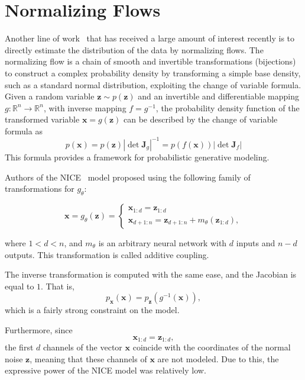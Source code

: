 \documentclass[a4paper,12pt]{article}
\theoremstyle{plain} %
\theoremstyle{definition} %
\theoremstyle{remark} %
\begin{document}
\section*{Normalizing Flows}

Another line of work~\cite{karami2020advances} that has received a large amount of interest recently is to directly estimate the distribution of the data by normalizing flows. The normalizing flow is a chain of smooth and invertible transformations (bijections) to construct a complex probability density by transforming a simple base density, such as a standard normal distribution, exploiting the change of variable formula.
Given a random variable $\boldsymbol{z} \sim p(\boldsymbol{z})$ and an invertible and differentiable mapping $g: \mathbb{R}^n \rightarrow \mathbb{R}^n$, with inverse mapping $f = g^{-1}$, the probability density function of the transformed variable $\boldsymbol{x} = g(\boldsymbol{z})$ can be described by the change of variable formula as
\begin{equation} 
p(\boldsymbol{x}) = p(\boldsymbol{z}) \left| \det \boldsymbol{J}_g \right|^{-1} = p(f(\boldsymbol{x})) \left| \det \boldsymbol{J}_f \right| 
\end{equation}
This formula provides a framework for probabilistic generative modeling.

Authors of the NICE~\cite{dinh2014nice} model proposed using the following family of transformations for $g_\theta$:

\[
\boldsymbol{x} = g_\theta(\boldsymbol{z}) = \begin{cases}
\boldsymbol{x}_{1:d} = \boldsymbol{z}_{1:d} \\
\boldsymbol{x}_{d+1:n} = \boldsymbol{z}_{d+1:n} + m_\theta(\boldsymbol{z}_{1:d}),
\end{cases}
\]

where $1 < d < n$, and $m_\theta$ is an arbitrary neural network with $d$ inputs and $n-d$ outputs. This transformation is called additive coupling.

The inverse transformation is computed with the same ease, and the Jacobian is equal to $1$. That is,
\[
p_{\boldsymbol{x}}(\boldsymbol{x}) = p_{\boldsymbol{z}}(g^{-1}(\boldsymbol{x})),
\]
which is a fairly strong constraint on the model.

Furthermore, since
\[
\boldsymbol{x}_{1:d} = \boldsymbol{z}_{1:d},
\]
the first $d$ channels of the vector $\boldsymbol{x}$ coincide with the coordinates of the normal noise $\boldsymbol{z}$, meaning that these channels of $\boldsymbol{x}$ are not modeled. Due to this, the expressive power of the NICE model was relatively low.
\end{document}
